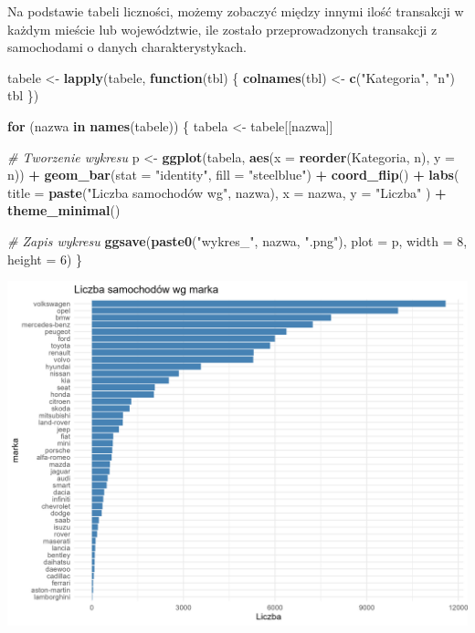 \documentclass[
]{article}
\newenvironment{Shaded}{\begin{snugshade}}{\end{snugshade}}
\newcommand{\AttributeTok}[1]{\textcolor[rgb]{0.13,0.29,0.53}{#1}}
\newcommand{\CommentTok}[1]{\textcolor[rgb]{0.56,0.35,0.01}{\textit{#1}}}
\newcommand{\ControlFlowTok}[1]{\textcolor[rgb]{0.13,0.29,0.53}{\textbf{#1}}}
\newcommand{\DecValTok}[1]{\textcolor[rgb]{0.00,0.00,0.81}{#1}}
\newcommand{\FunctionTok}[1]{\textcolor[rgb]{0.13,0.29,0.53}{\textbf{#1}}}
\newcommand{\NormalTok}[1]{#1}
\newcommand{\OtherTok}[1]{\textcolor[rgb]{0.56,0.35,0.01}{#1}}
\newcommand{\SpecialCharTok}[1]{\textcolor[rgb]{0.81,0.36,0.00}{\textbf{#1}}}
\newcommand{\StringTok}[1]{\textcolor[rgb]{0.31,0.60,0.02}{#1}}
\begin{document}
Na podstawie tabeli liczności, możemy zobaczyć między innymi ilość
transakcji w każdym mieście lub województwie, ile zostało
przeprowadzonych transakcji z samochodami o danych charakterystykach.

\begin{Shaded}
\begin{Highlighting}[]
\NormalTok{tabele }\OtherTok{\textless{}{-}} \FunctionTok{lapply}\NormalTok{(tabele, }\ControlFlowTok{function}\NormalTok{(tbl) \{}
  \FunctionTok{colnames}\NormalTok{(tbl) }\OtherTok{\textless{}{-}} \FunctionTok{c}\NormalTok{(}\StringTok{"Kategoria"}\NormalTok{, }\StringTok{"n"}\NormalTok{)}
\NormalTok{  tbl}
\NormalTok{\})}

\ControlFlowTok{for}\NormalTok{ (nazwa }\ControlFlowTok{in} \FunctionTok{names}\NormalTok{(tabele)) \{}
\NormalTok{  tabela }\OtherTok{\textless{}{-}}\NormalTok{ tabele[[nazwa]]}
  
  \CommentTok{\# Tworzenie wykresu}
\NormalTok{  p }\OtherTok{\textless{}{-}} \FunctionTok{ggplot}\NormalTok{(tabela, }\FunctionTok{aes}\NormalTok{(}\AttributeTok{x =} \FunctionTok{reorder}\NormalTok{(Kategoria, n), }\AttributeTok{y =}\NormalTok{ n)) }\SpecialCharTok{+}
    \FunctionTok{geom\_bar}\NormalTok{(}\AttributeTok{stat =} \StringTok{"identity"}\NormalTok{, }\AttributeTok{fill =} \StringTok{"steelblue"}\NormalTok{) }\SpecialCharTok{+}
    \FunctionTok{coord\_flip}\NormalTok{() }\SpecialCharTok{+}
    \FunctionTok{labs}\NormalTok{(}
      \AttributeTok{title =} \FunctionTok{paste}\NormalTok{(}\StringTok{"Liczba samochodów wg"}\NormalTok{, nazwa),}
      \AttributeTok{x =}\NormalTok{ nazwa,}
      \AttributeTok{y =} \StringTok{"Liczba"}
\NormalTok{    ) }\SpecialCharTok{+}
    \FunctionTok{theme\_minimal}\NormalTok{()}
  
  \CommentTok{\# Zapis wykresu}
  \FunctionTok{ggsave}\NormalTok{(}\FunctionTok{paste0}\NormalTok{(}\StringTok{"wykres\_"}\NormalTok{, nazwa, }\StringTok{".png"}\NormalTok{), }\AttributeTok{plot =}\NormalTok{ p, }\AttributeTok{width =} \DecValTok{8}\NormalTok{, }\AttributeTok{height =} \DecValTok{6}\NormalTok{)}
\NormalTok{\}}
\end{Highlighting}
\end{Shaded}

\includegraphics[width=1\linewidth]{analiza/wykres_marka}
\end{document}
